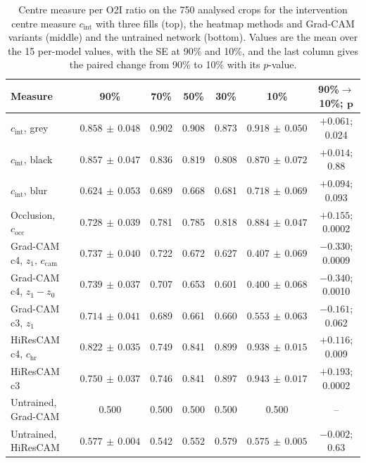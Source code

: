\begin{table}[htbp]
\centering
\caption[Intervention centre measure and heatmap variants]{Centre measure per O2I ratio
on the 750 analysed crops for the intervention centre measure $c_{\mathrm{int}}$ with
three fills (top), the heatmap methods and Grad-CAM variants (middle) and the untrained
network (bottom). Values are the mean over the 15 per-model values, with the SE at 90\%
and 10\%, and the last column gives the paired change from 90\% to 10\% with its
$p$-value.}
\label{tab:intervention-c}
\footnotesize
\setlength{\tabcolsep}{3pt}
\begin{tabular}{lcccccc}
\toprule
Measure & 90\% & 70\% & 50\% & 30\% &
10\% & 90\%$\to$10\%; $\boldsymbol{p}$ \\
\midrule
$c_{\mathrm{int}}$, grey  & $0.858\,{\pm}\,0.048$ & 0.902 & 0.908 & 0.873 & $0.918\,{\pm}\,0.050$ & $+0.061$; 0.024 \\
$c_{\mathrm{int}}$, black & $0.857\,{\pm}\,0.047$ & 0.836 & 0.819 & 0.808 & $0.870\,{\pm}\,0.072$ & $+0.014$; 0.88 \\
$c_{\mathrm{int}}$, blur  & $0.624\,{\pm}\,0.053$ & 0.689 & 0.668 & 0.681 & $0.718\,{\pm}\,0.069$ & $+0.094$; 0.093 \\
\midrule
Occlusion, $c_{\mathrm{occ}}$       & $0.728\,{\pm}\,0.039$ & 0.781 & 0.785 & 0.818 & $0.884\,{\pm}\,0.047$ & $+0.155$; 0.0002 \\
Grad-CAM c4, $z_1$, $c_{\mathrm{cam}}$ & $0.737\,{\pm}\,0.040$ & 0.722 & 0.672 & 0.627 & $0.407\,{\pm}\,0.069$ & $-0.330$; 0.0009 \\
Grad-CAM c4, $z_1 - z_0$            & $0.739\,{\pm}\,0.037$ & 0.707 & 0.653 & 0.601 & $0.400\,{\pm}\,0.068$ & $-0.340$; 0.0010 \\
Grad-CAM c3, $z_1$                  & $0.714\,{\pm}\,0.041$ & 0.689 & 0.661 & 0.660 & $0.553\,{\pm}\,0.063$ & $-0.161$; 0.062 \\
HiResCAM c4, $c_{\mathrm{hr}}$      & $0.822\,{\pm}\,0.035$ & 0.749 & 0.841 & 0.899 & $0.938\,{\pm}\,0.015$ & $+0.116$; 0.009 \\
HiResCAM c3                         & $0.750\,{\pm}\,0.037$ & 0.746 & 0.841 & 0.897 & $0.943\,{\pm}\,0.017$ & $+0.193$; 0.0002 \\
\midrule
Untrained, Grad-CAM                 & 0.500 & 0.500 & 0.500 & 0.500 & 0.500 & -- \\
Untrained, HiResCAM                 & $0.577\,{\pm}\,0.004$ & 0.542 & 0.552 & 0.579 & $0.575\,{\pm}\,0.005$ & $-0.002$; 0.63 \\
\bottomrule
\end{tabular}
\end{table}

